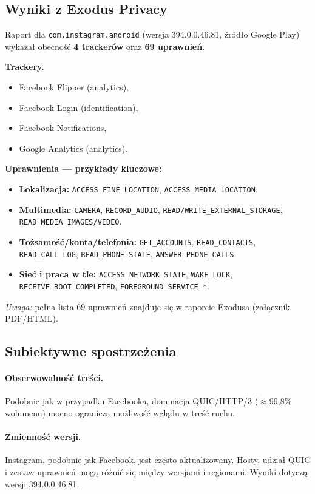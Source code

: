 \subsection{Wyniki z Exodus Privacy \cite{ExodusPrivacy}}
Raport dla \texttt{com.instagram.android} (wersja 394.0.0.46.81, źródło Google Play) wykazał obecność \textbf{4 trackerów} oraz \textbf{69 uprawnień}.

\textbf{Trackery.}
\begin{itemize}
  \item Facebook Flipper (analytics),
  \item Facebook Login (identification),
  \item Facebook Notifications,
  \item Google Analytics (analytics).
\end{itemize}

\textbf{Uprawnienia — przykłady kluczowe:}
\begin{itemize}
  \item \textbf{Lokalizacja:} \texttt{ACCESS\_FINE\_LOCATION}, \texttt{ACCESS\_MEDIA\_LOCATION}.
  \item \textbf{Multimedia:} \texttt{CAMERA}, \texttt{RECORD\_AUDIO}, \texttt{READ/WRITE\_EXTERNAL\_STORAGE}, \texttt{READ\_MEDIA\_IMAGES/VIDEO}.
  \item \textbf{Tożsamość/konta/telefonia:} \texttt{GET\_ACCOUNTS}, \texttt{READ\_CONTACTS}, \texttt{READ\_CALL\_LOG}, \texttt{READ\_PHONE\_STATE}, \texttt{ANSWER\_PHONE\_CALLS}.
  \item \textbf{Sieć i praca w tle:} \texttt{ACCESS\_NETWORK\_STATE}, \texttt{WAKE\_LOCK}, \texttt{RECEIVE\_BOOT\_COMPLETED}, \texttt{FOREGROUND\_SERVICE\_*}.
\end{itemize}

\emph{Uwaga:} pełna lista 69 uprawnień znajduje się w raporcie Exodusa (załącznik PDF/HTML).

\subsection{Subiektywne spostrzeżenia}
\paragraph{Obserwowalność treści.}
Podobnie jak w przypadku Facebooka, dominacja QUIC/HTTP/3 ($\approx$99,8\% wolumenu) mocno ogranicza możliwość wglądu w treść ruchu.

\paragraph{Zmienność wersji.}
Instagram, podobnie jak Facebook, jest często aktualizowany. Hosty, udział QUIC i zestaw uprawnień mogą różnić się między wersjami i regionami. Wyniki dotyczą wersji 394.0.0.46.81.

